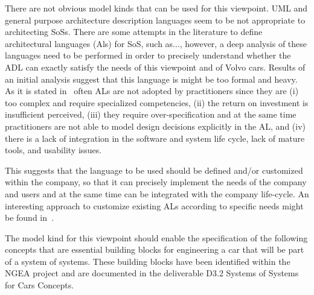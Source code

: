 There are not obvious model kinds that can be used for this viewpoint. UML and general purpose architecture description languages seem to be not appropriate to architecting SoSs. There are some attempts in the literature to define architectural languages (Als) for SoS, such as..., however, a deep analysis of these languages need to be performed in order to precisely understand whether the ADL can exactly satisfy the needs of this viewpoint and of Volvo cars. Results of an initial analysis suggest that this language is might be too formal and heavy. As it is stated in~\cite{whatindustrywants,IEEESoftwarePatrizio} often ALs are not adopted by practitioners since they are (i) too complex and require specialized competencies, (ii) the return on investment is insufficient perceived, (iii) they require over-specification and at the same time practitioners are not able to model design decisions explicitly in the AL, and (iv) there is a lack of integration in the software and system life cycle, lack of
mature tools, and usability issues. 

This suggests that the language to be used should be defined and/or customized within the company, so that it can precisely implement the needs of the company and users and at the same time can be integrated with the company life-cycle.
An interesting approach to customize existing ALs according to specific needs might be found in~\cite{ICSE2010}.

The model kind for this viewpoint should enable the specification of the following concepts that are essential building blocks for engineering a car that will be part of a system of systems. These building blocks have been identified within the NGEA project and are documented in the deliverable D3.2 Systems of Systems for Cars Concepts. 

